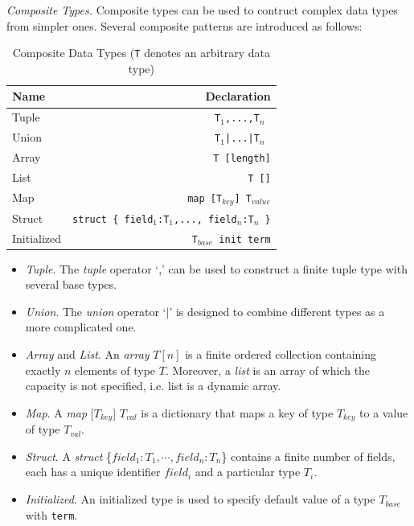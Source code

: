 \noindent\emph{Composite Types.} Composite types can be used to contruct complex data types from simpler ones. Several composite patterns are introduced as follows:

\begin{table}
    \caption{Composite Data Types (\texttt{T} denotes an arbitrary data type)}
    \centering
    \begin{tabular}{lr}
        \hline
        Name & Declaration \T\B \\
        \hline
        \T Tuple  & \texttt{T$_1$,...,T$_n$ }\\
        Union & \texttt{T$_1$|...|T$_n$ } \\
        Array & \texttt{T [length]}\\
        List & \texttt{T []} \\
        Map & \texttt{map [T$_{key}$] T$_{value}$} \\
        Struct\hspace{1cm} & \texttt{struct \{ field$_1$:T$_1$,..., field$_n$:T$_n$ \}} \\
        \B Initialized & \texttt{T$_{base}$ init term} \\
        \hline
    \end{tabular}
\end{table}

\begin{itemize}
    \item \emph{Tuple}. The \emph{tuple} operator `,' can be used to construct a finite tuple type with several base types.
    \item \emph{Union}. The \emph{union} operator `$|$' is designed to combine different types as a more complicated one. 
    \item \emph{Array} and \emph{List}. An \emph{array} $T[n]$ is a finite ordered collection containing exactly $n$ elements of type $T$. Moreover, a \emph{list} is an array of which the capacity is not specified, i.e. list is a dynamic array.
    \item \emph{Map}. A \emph{map }[$T_{key}$] $T_{val}$ is a dictionary that maps a key of type $T_{key}$ to a value of type $T_{val}$.
    \item \emph{Struct}. A \emph{struct }\{$field_1:T_1,\cdots,field_n:T_n$\} contains a finite number of fields, each has  a unique identifier $field_i$ and a particular type $T_i$.
    \item \emph{Initialized}. An initialized type is used to specify default value of a type $T_{base}$ with \texttt{term}.
\end{itemize}

